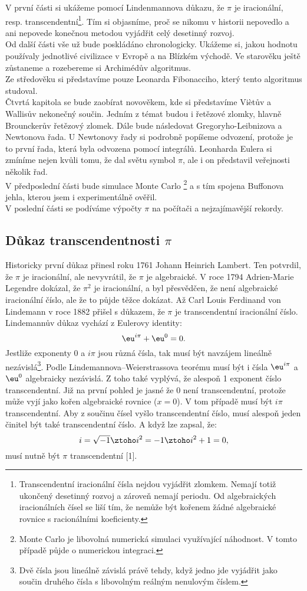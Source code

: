 \documentclass[rocnikovka]{gzwroc} %
\begin{document}
V první části si ukážeme pomocí Lindenmannova důkazu, že $\pi$ je iracionální, resp. transcendentní\footnote[2]{Transcendentní iracionální čísla nejdou vyjádřit zlomkem. Nemají totiž ukončený desetinný rozvoj a zároveň nemají periodu. Od algebraických  iracionálních čísel se liší tím, že nemůže být kořenem žádné algebraické rovnice s racionálními koeficienty.}. Tím si objasníme, proč se nikomu v historii nepovedlo a ani nepovede konečnou metodou vyjádřit celý desetinný rozvoj.\\
Od další části vše už bude poskládáno chronologicky. Ukážeme si, jakou hodnotu používaly jednotlivé civilizace v Evropě a na Blízkém východě. Ve starověku ještě zůstaneme a rozebereme si Archimédův algoritmus.\\
Ze středověku si představíme pouze Leonarda Fibonacciho, který tento algoritmus studoval.\\
Čtvrtá kapitola se bude zaobírat novověkem, kde si představíme Viètův a Wallisův nekonečný součin. Jedním z témat budou i řetězové zlomky, hlavně Brounckerův řetězový zlomek. Dále bude následovat Gregoryho-Leibnizova a Newtonova řada. U Newtonovy řady si podrobně popíšeme odvození, protože je to první řada, která byla odvozena pomocí integrálů. Leonharda Eulera si zmíníme nejen kvůli tomu, že dal světu symbol $\pi$, ale i on představil veřejnosti několik řad.\\
V předposlední části bude simulace Monte Carlo \footnote[3]{Monte Carlo je libovolná numerická simulaci využívající náhodnost. V tomto případě půjde o numerickou integraci.} a s tím spojena Buffonova jehla, kterou jsem i experimentálně ověřil.\\
V poslední části se podíváme výpočty $\pi$ na počítači a nejzajímavější rekordy.
\subsection{Důkaz transcendentnosti $\pi$}
Historicky první důkaz přinesl roku 1761 Johann Heinrich Lambert. Ten potvrdil, že $\pi$ je iracionální, ale nevyvrátil, že $\pi$ je algebraické. V roce 1794 Adrien-Marie Legendre dokázal, že $\pi^2$ je iracionální, a byl přesvědčen, že není algebraické iracionální číslo, ale že to půjde těžce dokázat. Až Carl Louis Ferdinand von Lindemann v roce 1882 přišel s důkazem, že $\pi$ je transcendentní iracionální číslo.\\
Lindemannův důkaz vychází z Eulerovy identity:
$$
\eu^{i\pi}+\eu^{0}=0.
$$
Jestliže exponenty 0 a $i\pi$ jsou různá čísla, tak musí být navzájem lineálně nezávislá\footnote[3]{Dvě čísla jsou lineálně závislá právě tehdy, když jedno jde vyjádřit jako součin druhého čísla s libovolným reálným nenulovým číslem.}. Podle Lindemannova–Weierstrassova teorému musí být i čísla $\eu^{i\pi}$ a $\eu^{0}$ algebraicky nezávislá. Z toho také vyplývá, že alespoň 1 exponent číslo transcendentní. Již na první pohled je jasné že 0 není transcendentní, protože může vyjí jako kořen algebraické rovnice ($x=0$). V tom případě musí být $i\pi$ transcendentní. Aby z součinu čísel vyšlo transcendentní číslo, musí alespoň jeden činitel být také transcendentní číslo. A když lze zapsal, že:
$$
i=\sqrt{-1} \ztoho i^2=-1 \ztoho i^2+1=0,
$$
musí nutně být $\pi$ transcendentní [1].
\end{document}
